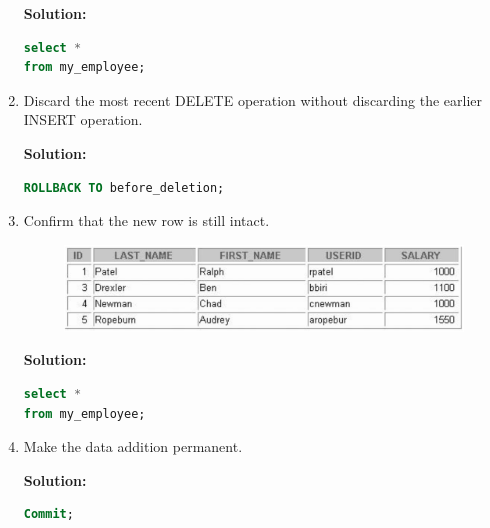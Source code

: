 \begin{enumerate}
    \textbf{Solution: }
    \begin{lstlisting}[language=SQL]
select *
from my_employee;
    \end{lstlisting}
    \item Discard the most recent DELETE operation without discarding the earlier INSERT operation.
    
    \textbf{Solution: }
    \begin{lstlisting}[language=SQL]
ROLLBACK TO before_deletion;
    \end{lstlisting}
    \newpage
    \item Confirm that the new row is still intact.
    \begin{figure}[h]
        \centering
        \includegraphics[width=0.9\linewidth]{graphics/822.png}
    \end{figure}

    \textbf{Solution: }
    \begin{lstlisting}[language=SQL]
select *
from my_employee;
    \end{lstlisting}
    \item Make the data addition permanent.
    
    \textbf{Solution: }
    \begin{lstlisting}[language=SQL]
Commit;
    \end{lstlisting}
\end{enumerate}
